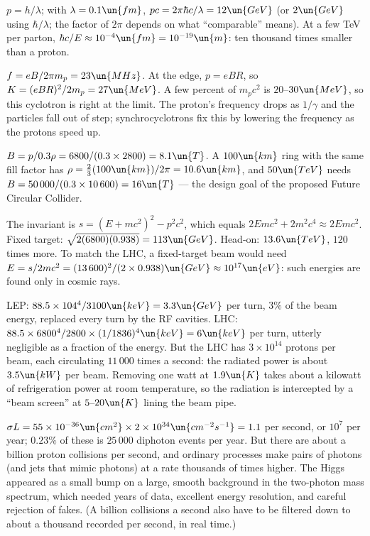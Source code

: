 
 $p = h/\lambda$; with $\lambda = 0.1\un{fm}$, $pc = 2\pi\hbar c/\lambda = 12\un{GeV}$ (or $2\un{GeV}$ using $\hbar/\lambda$; the factor of $2\pi$ depends on what ``comparable'' means). At a few TeV per parton, $\hbar c/E\approx10^{-4}\un{fm} = 10^{-19}\un{m}$: ten thousand times smaller than a proton.

 $f = eB/2\pi m_p = 23\un{MHz}$. At the edge, $p = eBR$, so $K = (eBR)^2/2m_p = 27\un{MeV}$. A few percent of $m_pc^2$ is $20$--$30\un{MeV}$, so this cyclotron is right at the limit. The proton's frequency drops as $1/\gamma$ and the particles fall out of step; synchrocyclotrons fix this by lowering the frequency as the protons speed up.

 $B = p/0.3\rho = 6800/(0.3\times2800) = 8.1\un{T}$. A $100\un{km}$ ring with the same fill factor has $\rho = \tfrac23(100\un{km})/2\pi = 10.6\un{km}$, and $50\un{TeV}$ needs $B = 50\,000/(0.3\times10\,600) = 16\un{T}$ --- the design goal of the proposed Future Circular Collider.

 The invariant is $s = (E + mc^2)^2 - p^2c^2$, which equals $2Emc^2 + 2m^2c^4\approx2Emc^2$. Fixed target: $\sqrt{2(6800)(0.938)} = 113\un{GeV}$. Head-on: $13.6\un{TeV}$, $120$ times more. To match the LHC, a fixed-target beam would need $E = s/2mc^2 = (13\,600)^2/(2\times0.938)\un{GeV}\approx10^{17}\un{eV}$: such energies are found only in cosmic rays.

 LEP: $88.5\times104^4/3100\un{keV} = 3.3\un{GeV}$ per turn, $3\%$ of the beam energy, replaced every turn by the RF cavities. LHC: $88.5\times6800^4/2800\times(1/1836)^4\un{keV} = 6\un{keV}$ per turn, utterly negligible as a fraction of the energy. But the LHC has $3\times10^{14}$ protons per beam, each circulating $11\,000$ times a second: the radiated power is about $3.5\un{kW}$ per beam. Removing one watt at $1.9\un{K}$ takes about a kilowatt of refrigeration power at room temperature, so the radiation is intercepted by a ``beam screen'' at $5$--$20\un{K}$ lining the beam pipe.

 $\sigma L = 55\times10^{-36}\un{cm^2}\times2\times10^{34}\un{cm^{-2}s^{-1}} = 1.1$ per second, or $10^7$ per year; $0.23\%$ of these is $25\,000$ diphoton events per year. But there are about a billion proton collisions per second, and ordinary processes make pairs of photons (and jets that mimic photons) at a rate thousands of times higher. The Higgs appeared as a small bump on a large, smooth background in the two-photon mass spectrum, which needed years of data, excellent energy resolution, and careful rejection of fakes. (A billion collisions a second also have to be filtered down to about a thousand recorded per second, in real time.)

